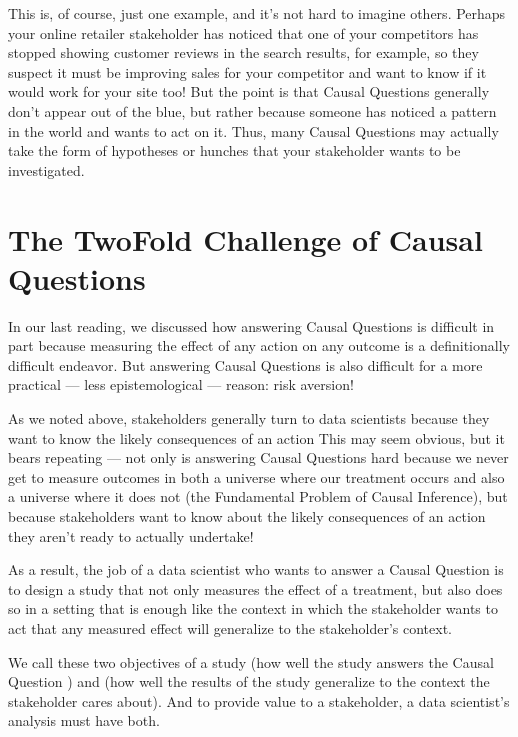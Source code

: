 \documentclass[letterpaper,10pt,english]{jupyterBook}
\begin{document}
\sphinxAtStartPar
This is, of course, just one example, and it’s not hard to imagine others. Perhaps your online retailer stakeholder has noticed that one of your competitors has stopped showing customer reviews in the search results, for example, so they suspect it must be improving sales for your competitor and want to know if it would work for your site too! But the point is that Causal Questions generally don’t appear out of the blue, but rather because someone has noticed a pattern in the world and wants to act on it. Thus, many Causal Questions may actually take the form of hypotheses or hunches that your stakeholder wants to be investigated.


\section{The Two\sphinxhyphen{}Fold Challenge of Causal Questions}
\label{\detokenize{30_questions/30_using_causal_questions:the-two-fold-challenge-of-causal-questions}}
\sphinxAtStartPar
In our last reading, we discussed how answering Causal Questions is difficult in part because measuring the effect of any action on any outcome is a definitionally difficult endeavor. But answering Causal Questions is also difficult for a more practical — less epistemological — reason: risk aversion!

\sphinxAtStartPar
As we noted above, stakeholders generally turn to data scientists because they want to know the likely consequences of an action  This may seem obvious, but it bears repeating — not only is answering Causal Questions hard because we never get to measure outcomes in both a universe where our treatment occurs and also a universe where it does not (the Fundamental Problem of Causal Inference), but  because stakeholders want to know about the likely consequences of an action they aren’t ready to actually undertake!

\sphinxAtStartPar
As a result, the job of a data scientist who wants to answer a Causal Question is to design a study that not only measures the effect of a treatment, but also does so in a setting that is enough like the context in which the stakeholder wants to act that any measured effect will generalize to the stakeholder’s context.

\sphinxAtStartPar
We call these two objectives of a study  (how well the study answers the Causal Question ) and  (how well the results of the study generalize to the context the stakeholder cares about). And to provide value to a stakeholder, a data scientist’s analysis must have both.
\end{document}
